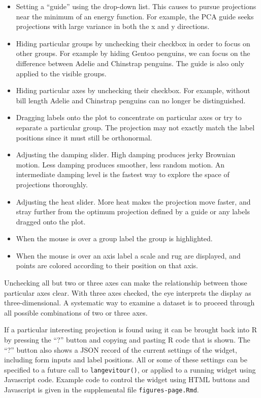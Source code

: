 \begin{itemize}
\item
  Setting a ``guide'' using the drop-down list. This causes  to pursue projections near the minimum of an energy function. For example, the PCA guide seeks projections with large variance in both the x and y directions.
\item
  Hiding particular groups by unchecking their checkbox in order to focus on other groups. For example by hiding Gentoo penguins, we can focus on the difference between Adelie and Chinstrap penguins. The guide is also only applied to the visible groups.
\item
  Hiding particular axes by unchecking their checkbox. For example, without bill length Adelie and Chinstrap penguins can no longer be distinguished.
\item
  Dragging labels onto the plot to concentrate on particular axes or try to separate a particular group. The projection may not exactly match the label positions since it must still be orthonormal.
\item
  Adjusting the damping slider. High damping produces jerky Brownian motion. Less damping produces smoother, less random motion. An intermediate damping level is the fastest way to explore the space of projections thoroughly.
\item
  Adjusting the heat slider. More heat makes the projection move faster, and stray further from the optimum projection defined by a guide or any labels dragged onto the plot.
\item
  When the mouse is over a group label the group is highlighted.
\item
  When the mouse is over an axis label a scale and rug are displayed, and points are colored according to their position on that axis.
\end{itemize}

Unchecking all but two or three axes can make the relationship between those particular axes clear. With three axes checked, the eye interprets the display as three-dimensional. A systematic way to examine a dataset is to proceed through all possible combinations of two or three axes.

If a particular interesting projection is found using  it can be brought back into R by pressing the ``?'' button and copying and pasting R code that is shown. The ``?'' button also shows a JSON record of the current settings of the widget, including form inputs and label positions. All or some of these settings can be specified to a future call to \texttt{langevitour()}, or applied to a running widget using Javascript code. Example code to control the widget using HTML buttons and Javascript is given in the supplemental file \texttt{figures-page.Rmd}.

